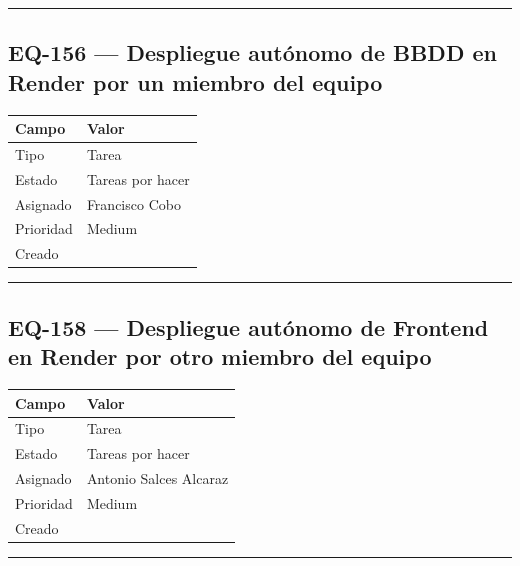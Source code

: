 \documentclass[
  spanish,
  11pt,
]{report}
\newcounter{none} %
\begin{document}
\begin{center}\rule{0.5\linewidth}{0.5pt}\end{center}

\subsection{EQ-156 --- Despliegue autónomo de BBDD en Render por un
miembro del
equipo}\label{eq-156-despliegue-autuxf3nomo-de-bbdd-en-render-por-un-miembro-del-equipo}

{\def\LTcaptype{none} %
\begin{longtable}[]{@{}ll@{}}
\toprule\noalign{}
Campo & Valor \\
\midrule\noalign{}
\endhead
\bottomrule\noalign{}
\endlastfoot
Tipo & Tarea \\
Estado & Tareas por hacer \\
Asignado & Francisco Cobo \\
Prioridad & Medium \\
Creado & \\
\end{longtable}
}

\begin{center}\rule{0.5\linewidth}{0.5pt}\end{center}

\subsection{EQ-158 --- Despliegue autónomo de Frontend en Render por
otro miembro del
equipo}\label{eq-158-despliegue-autuxf3nomo-de-frontend-en-render-por-otro-miembro-del-equipo}

{\def\LTcaptype{none} %
\begin{longtable}[]{@{}ll@{}}
\toprule\noalign{}
Campo & Valor \\
\midrule\noalign{}
\endhead
\bottomrule\noalign{}
\endlastfoot
Tipo & Tarea \\
Estado & Tareas por hacer \\
Asignado & Antonio Salces Alcaraz \\
Prioridad & Medium \\
Creado & \\
\end{longtable}
}

\begin{center}\rule{0.5\linewidth}{0.5pt}\end{center}
\end{document}
